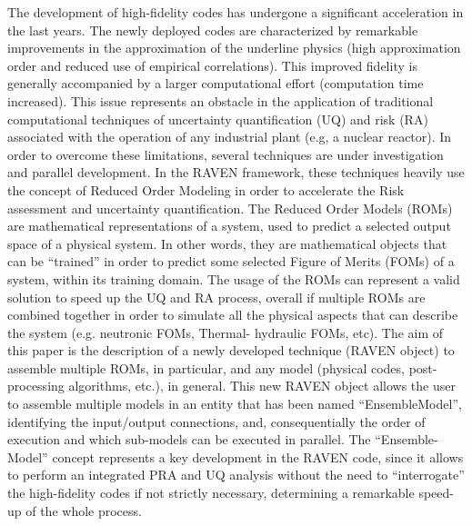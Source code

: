 The development of high-fidelity codes has undergone a significant acceleration in the last years. The newly deployed codes are characterized by 
remarkable improvements in the approximation of the underline physics (high approximation order and reduced use of empirical correlations). This
 improved fidelity is generally accompanied by a larger computational effort (computation time increased). This issue represents an obstacle in the 
 application of traditional computational techniques of uncertainty quantification (UQ) and risk (RA) associated with the operation of any industrial 
 plant (e.g, a nuclear reactor).
In order to overcome these limitations, several techniques are under investigation and parallel development. In the RAVEN framework, these 
techniques heavily use the concept of Reduced Order Modeling in order to accelerate the Risk assessment and uncertainty quantification. The 
Reduced Order Models (ROMs) are mathematical representations of a system, used to predict a selected output space of a physical system. In other 
words, they are mathematical objects that can be ``trained'' in order to predict some selected Figure of Merits (FOMs) of a system, within its training 
domain.
The usage of the ROMs can represent a valid solution to speed up the UQ and RA process, overall if multiple ROMs are combined together in order 
to simulate all the physical aspects that can describe the system (e.g. neutronic FOMs, Thermal- hydraulic FOMs, etc). The aim of this paper is the 
description of a newly developed technique (RAVEN object) to assemble multiple ROMs, in particular, and any model (physical codes, post-
processing algorithms, etc.), in general. This new RAVEN object allows the user to assemble multiple models in an entity that has been named 
``EnsembleModel'', identifying the input/output connections, and, consequentially the order of execution and which sub-models can be executed in 
parallel.
The ``Ensemble-Model'' concept represents a key development in the RAVEN code, since it allows to perform an integrated PRA and UQ analysis 
without the need to ``interrogate'' the high-fidelity codes if not strictly necessary, determining a remarkable speed-up of the whole process.